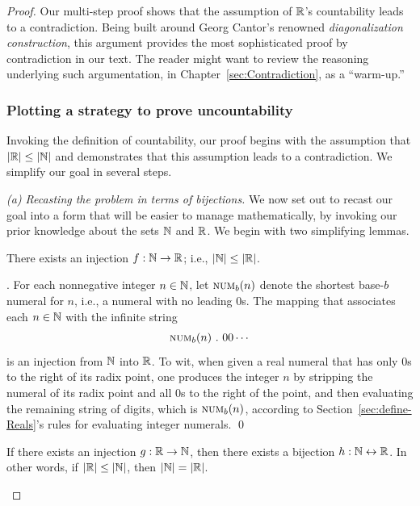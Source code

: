 \begin{proof}
Our multi-step proof shows that the assumption of $\mathbb{R}$'s countability
leads to a contradiction.  Being built around Georg Cantor's renowned
{\it diagonalization construction},  this
argument provides the most sophisticated proof by contradiction in our
text.  The reader might want to review the reasoning underlying such
argumentation, in Chapter~\ref{sec:Contradiction}, as a ``warm-up.''

\subsubsection{Plotting a strategy to prove uncountability}
\label{sec:the-diag-strategy}

Invoking the definition of countability, our proof begins with the
assumption that $|\mathbb{R}| \leq |\mathbb{N}|$ and demonstrates that this assumption
leads to a contradiction.  We simplify our goal in several steps.

{\it (a) Recasting the problem in terms of bijections.}
We now set out to recast our goal into a form that will be easier to
manage mathematically, by invoking our prior knowledge about the sets
$\mathbb{N}$ and $\mathbb{R}$.  We begin with two simplifying lemmas.

\begin{lemma}
\label{lem:N-leq-R}
There exists an injection $f: \mathbb{N} \rightarrow \mathbb{R}$; i.e., $|\mathbb{N}| \leq
|\mathbb{R}|$.
\end{lemma}

.
%
For each nonnegative integer $n \in \mathbb{N}$, let $\mbox{\sc num}_b(n)$
denote the shortest base-$b$ numeral for $n$, i.e., a numeral with no
leading $0$s.  The mapping that associates each $n \in \mathbb{N}$ with the
infinite string
\[ \mbox{\sc num}_b(n) \ . \ 00 \cdots \]
is an injection from $\mathbb{N}$ into $\mathbb{R}$.  To wit, when given a real
numeral that has only $0$s to the right of its radix point, one
produces the integer $n$ by stripping the numeral of its radix point
and all $0$s to the right of the point, and then evaluating the
remaining string of digits, which is $\mbox{\sc num}_b(n)$, according
to Section~\ref{sec:define-Reals}'s rules for evaluating integer
numerals.  \qed

\begin{lemma}
\label{lem:N-=-R}
If there exists an injection $g: \mathbb{R} \rightarrow \mathbb{N}$, then there exists
a bijection $h: \mathbb{N} \leftrightarrow \mathbb{R}$.  In other words, if $|\mathbb{R}| \leq
|\mathbb{N}|$, then $|\mathbb{N}| = |\mathbb{R}|$.
\end{lemma}


\end{proof}
